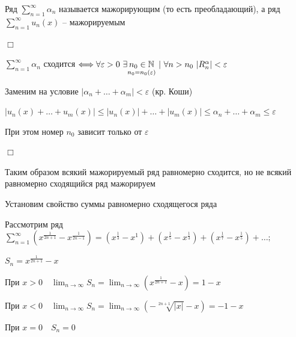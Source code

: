 \documentclass[12pt]{article}
\begin{document}
    \Nota Ряд $\sum_{n = 1}^\infty \alpha_n$ называется мажорирующим (то есть преобладающий), 
    а ряд $\sum_{n = 1}^\infty u_n(x)$ -- мажорируемым

    \begin{MyProof}
        $\Box$

        $\sum_{n = 1}^\infty \alpha_n$ сходится $\Longleftrightarrow \forall \varepsilon > 0 \ \exists \underset{n_0 = n_0(\varepsilon)}{n_0 \in \mathbb{N}} \ | \
        \forall n > n_0 \ |R_n^\alpha| < \varepsilon$

        Заменим на условие $|\alpha_n + \dots + \alpha_m| < \varepsilon$ (кр. Коши)

        $|u_n(x) + \dots + u_m(x)| \leq |u_n(x)| + \dots + |u_m(x)| \leq \alpha_n + \dots + \alpha_m \leq \varepsilon$

        При этом номер $n_0$ зависит только от $\varepsilon$

        $\Box$
    \end{MyProof}

    \Nota Таким образом всякий мажорируемый ряд равномерно сходится, но не всякий равномерно сходящийся ряд мажорируем

    \Nota Установим свойство суммы равномерно сходящегося ряда

    \Exs Рассмотрим ряд $\sum_{n = 1}^\infty (x^{\frac{1}{2n + 1}} - x^{\frac{1}{2n - 1}}) = (x^\frac{1}{3} - x^1) + (x^\frac{1}{5} - x^\frac{1}{3}) + (x^\frac{1}{7} - x^\frac{1}{5}) + \dots;$

    $S_n = x^\frac{1}{2n + 1} - x$

    При $x > 0 \quad \lim_{n \to \infty} S_n = \lim_{n \to \infty} (x^\frac{1}{2n + 1} - x) = 1 - x$

    При $x < 0 \quad \lim_{n \to \infty} S_n = \lim_{n \to \infty} (-\sqrt[2n + 1]{|x|} - x) = -1 - x$

    При $x = 0 \quad S_n = 0$
\end{document}
